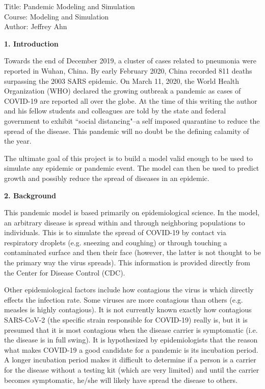 \documentclass[a4paper]{article}
\begin{document}
\begin{titlepage}
  \begin{center}
    Title: Pandemic Modeling and Simulation \\
    Course: Modeling and Simulation \\
    Author: Jeffrey Ahn \\
  \end{center}
\end{titlepage}

\newpage

\begin{center}
\textbf{1. Introduction}
\end{center}

Towards the end of
December 2019, a cluster of cases related to pneumonia were reported in
Wuhan, China. By early February 2020, China recorded 811 deaths surpassing the 2003 SARS
epidemic. On March 11, 2020, the World Health Organization (WHO) declared the
growing outbreak a pandemic as cases of COVID-19 are reported all over the
globe. At the time of this writing the author and his fellow students and
colleagues are told by the state and federal government to exhibit ``social 
distancing"--a self imposed quarantine to reduce the spread of the disease. This 
pandemic will no doubt be the defining calamity of the year.

The ultimate goal of this project is to build a model valid enough to be used
to simulate any epidemic or pandemic event. The model can then be 
used to predict growth and possibly reduce the spread of diseases in an
epidemic.

\begin{center}
  \textbf{2. Background}
\end{center}

This pandemic model is based primarily on epidemiological science. In the model,
an arbitrary disease is spread within and through neighboring populations to
individuals. This is to simulate the spread of COVID-19
by contact via respiratory droplets (e.g. sneezing and coughing) or through touching a 
contaminated surface and then
their face (however, the latter is not thought to be the primary way the virus spreads).
This information is provided directly from the Center for Disease Control (CDC). 

Other epidemiological factors include how contagious the virus is which 
directly effects the infection rate. Some viruses are more
contagious than others (e.g. measles is highly contagious). It is not currently
known exactly how contagious SARS-CoV-2 (the specific strain responsible for COVID-19)
really is, but it is presumed that it is most contagious when the disease
carrier is symptomatic (i.e. the disease is in full swing). It is hypothesized by 
epidemiologists that the reason what makes COVID-19 a good candidate for a pandemic is 
its incubation period. A longer incubation period makes it difficult to
determine if a person is a carrier for the disease without a testing kit (which
are very limited) and until the carrier becomes symptomatic, he/she will likely
have spread the disease to others.
\end{document}
